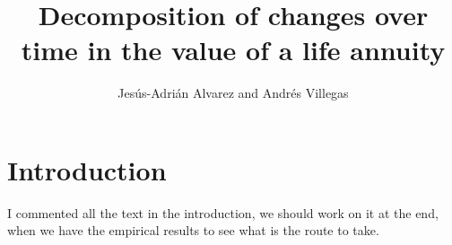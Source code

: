 \documentclass[12pt]{article}
\title{Decomposition of changes over time in the value of a life annuity}
\author{Jes\'us-Adri\'an Alvarez and Andr\'es Villegas}
\begin{document}
\maketitle

{
\setcounter{tocdepth}{2}
\tableofcontents
}

\section{Introduction}\label{introduction}

I commented all the text in the introduction, we should work on it at the end, when we have the empirical results to see what is the route to take.


 
 





\end{document}
